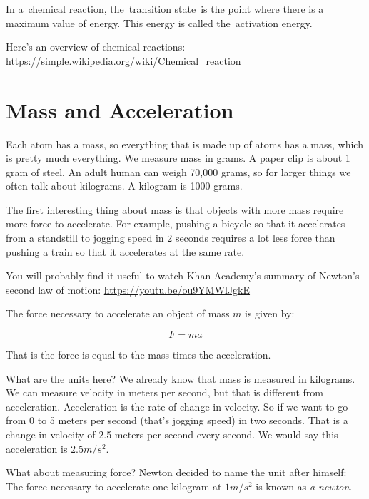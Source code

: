 In a chemical reaction, the transition state is the point where there is a maximum value of energy. This energy is called the activation energy. 

Here's an overview of chemical reactions: 
\url{https://simple.wikipedia.org/wiki/Chemical_reaction}


\section{Mass and Acceleration}

Each atom has a mass, so everything that is made up of atoms has a
mass, which is pretty much everything.  We measure mass in grams.  A
paper clip is about 1 gram of steel. An adult human can weigh 70,000
grams, so for larger things we often talk about kilograms. A kilogram
is 1000 grams.

The first interesting thing about mass is that objects with more mass
require more force to accelerate. For example, pushing a bicycle so
that it accelerates from a standstill to jogging speed in 2 seconds
requires a lot less force than pushing a train so that it accelerates
at the same rate.

You will probably find it useful to watch Khan Academy's summary of
Newton's second law of motion: \url{https://youtu.be/ou9YMWlJgkE}

\begin{mdframed}[style=important, frametitle={Newton's Second Law of Motion}]

The force necessary to accelerate an object of mass $m$ is given by:

$$F = m a$$

That is the force is equal to the mass times the acceleration.

\end{mdframed}

What are the units here? We already know that mass is measured in
kilograms. We can measure velocity in meters per second, but that is
different from acceleration. Acceleration is the rate of change in
velocity. So if we want to go from 0 to 5 meters per second (that's
jogging speed) in two seconds. That is a change in velocity of 2.5
meters per second every second. We would say this acceleration is $2.5
m/s^2$.

What about measuring force? Newton decided to name the unit after
himself: The force necessary to accelerate one kilogram at $1 m/s^2$
is known as \textit{a newton}.

